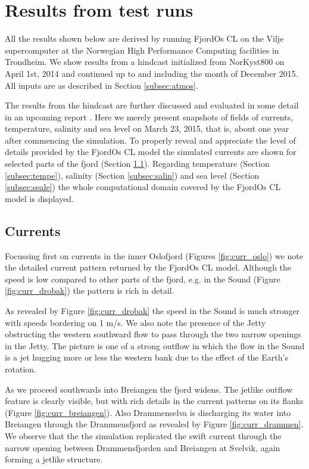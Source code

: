 \section{Results from test runs}
\label{sec:resul}
All the results shown below are derived by running FjordOs CL on the Vilje supercomputer at the Norwegian High Performance Computing facilities in Trondheim. We show results from a hindcast initialized from NorKyst800 on April 1st, 2014 and continued up to and including the month of December 2015. All inputs are as described in Section \ref{subsec:atmos}.
 
The results from the hindcast are further discussed and evaluated in some detail in an upcoming report \citep{hjelm:etal:2016}. Here we merely present snapshots of fields of currents, temperature, salinity and sea level on March 23, 2015, that is, about one year after commencing the simulation. To properly reveal and appreciate the level of details provided by the FjordOs CL model the simulated currents are shown for selected parts of the fjord (Section \ref{subsec:curre}). Regarding temperature (Section \ref{subsec:tempe}), salinity (Section \ref{subsec:salin}) and sea level (Section \ref{subsec:seale}) the whole computational domain covered by the FjordOs CL model is displayed. 

\subsection{Currents}
\label{subsec:curre}
Focussing first on currents in the inner Oslofjord (Figures \ref{fig:curr_oslo}) we note the detailed current pattern returned by the FjordOs CL model. Although the speed is low compared to other parts of the fjord, e.g. in the {\DR} Sound (Figure \ref{fig:curr_drobak}) the pattern is rich in detail. 
 

As revealed by Figure \ref{fig:curr_drobak} the speed in the {\DR} Sound is much stronger with speeds bordering on 1 m/s. We also note the presence of the Jetty obstructing the western southward flow to pass through the two narrow openings in the Jetty. The picture is one of a strong outflow in which the flow in the {\DR} Sound is a jet hugging more or less the western bank due to the effect of the Earth's rotation.   
 

As we proceed southwards into Breiangen the fjord widens. The jetlike outflow feature is clearly visible, but with rich details in the current patterns on its flanks (Figure \ref{fig:curr_breiangen}). Also Drammenselva is discharging its water into Breiangen through the Drammensfjord as revealed by Figure \ref{fig:curr_drammen}. We observe that the the simulation replicated the swift current through the narrow opening between Drammensfjorden and Breiangen at Svelvik, again forming a jetlike structure.  
\clearpage
   
 

